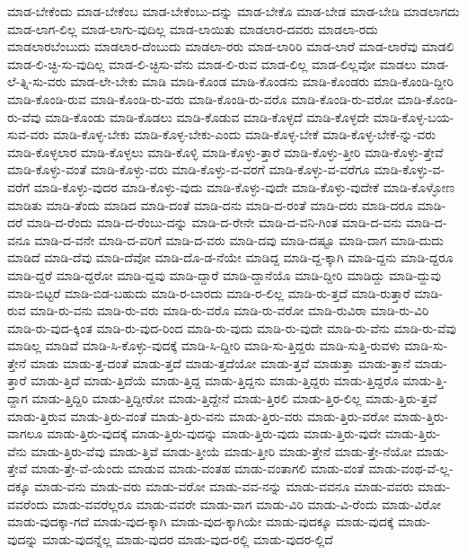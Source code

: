{ಮಾಡ-ಬೇಕೆಂದು
ಮಾಡ-ಬೇಕೆಂಬ
ಮಾಡ-ಬೇಕೆಂಬು-ದನ್ನು
ಮಾಡ-ಬೇಕೊ
ಮಾಡ-ಬೇಡ
ಮಾಡ-ಬೇಡಿ
ಮಾಡಲಾಗದು
ಮಾಡ-ಲಾಗ-ಲಿಲ್ಲ
ಮಾಡ-ಲಾಗು-ವುದಿಲ್ಲ
ಮಾಡ-ಲಾಯಿತು
ಮಾಡಲಾರ-ದವರು
ಮಾಡಲಾ-ರದು
ಮಾಡಲಾರಬೆಂಬುದು
ಮಾಡಲಾರ-ದೆಂಬುದು
ಮಾಡಲಾ-ರರು
ಮಾಡ-ಲಾರಿರಿ
ಮಾಡ-ಲಾರೆ
ಮಾಡ-ಲಾರೆವು
ಮಾಡಲಿ
ಮಾಡ-ಲಿ-ಚ್ಛಿ-ಸು-ವುದಿಲ್ಲ
ಮಾಡ-ಲಿ-ಚ್ಛಿಸು-ವೆನು
ಮಾಡ-ಲಿ-ರುವ
ಮಾಡ-ಲಿಲ್ಲ
ಮಾಡ-ಲಿಲ್ಲವೋ
ಮಾಡಲು
ಮಾಡ-ಲೆ-ತ್ನಿ-ಸು-ವರು
ಮಾಡ-ಲೇ-ಬೇಕು
ಮಾಡಿ
ಮಾಡಿ-ಕೊಂಡ
ಮಾಡಿ-ಕೊಂಡನು
ಮಾಡಿ-ಕೊಂಡರು
ಮಾಡಿ-ಕೊಂಡಿ-ದ್ದೀರಿ
ಮಾಡಿ-ಕೊಂಡಿ-ರುವ
ಮಾಡಿ-ಕೊಂಡಿ-ರು-ವರು
ಮಾಡಿ-ಕೊಂಡಿ-ರು-ವರೊ
ಮಾಡಿ-ಕೊಂಡಿ-ರು-ವರೋ
ಮಾಡಿ-ಕೊಂಡಿ-ರು-ವೆವು
ಮಾಡಿ-ಕೊಂಡು
ಮಾಡಿ-ಕೊಡಲು
ಮಾಡಿ-ಕೊಡುವ
ಮಾಡಿ-ಕೊಳ್ಳದೆ
ಮಾಡಿ-ಕೊಳ್ಳದೇ
ಮಾಡಿ-ಕೊಳ್ಳ-ಬಯ-ಸುವ-ವರು
ಮಾಡಿ-ಕೊಳ್ಳ-ಬೇಕು
ಮಾಡಿ-ಕೊಳ್ಳ-ಬೇಕು-ಎಂದು
ಮಾಡಿ-ಕೊಳ್ಳ-ಬೇಕೆ
ಮಾಡಿ-ಕೊಳ್ಳ-ಬೇಕೆ-ನ್ನು-ವರು
ಮಾಡಿ-ಕೊಳ್ಳಲಾರ
ಮಾಡಿ-ಕೊಳ್ಳಲು
ಮಾಡಿ-ಕೊಳ್ಳಿ
ಮಾಡಿ-ಕೊಳ್ಳು-ತ್ತಾರೆ
ಮಾಡಿ-ಕೊಳ್ಳು-ತ್ತೀರಿ
ಮಾಡಿ-ಕೊಳ್ಳು-ತ್ತೇವೆ
ಮಾಡಿ-ಕೊಳ್ಳು-ವಂತೆ
ಮಾಡಿ-ಕೊಳ್ಳು-ವರು
ಮಾಡಿ-ಕೊಳ್ಳು-ವ-ವರಗೆ
ಮಾಡಿ-ಕೊಳ್ಳು-ವ-ವರೆಗೂ
ಮಾಡಿ-ಕೊಳ್ಳು-ವ-ವರೆಗೆ
ಮಾಡಿ-ಕೊಳ್ಳು-ವುದರ
ಮಾಡಿ-ಕೊಳ್ಳು-ವುದು
ಮಾಡಿ-ಕೊಳ್ಳು-ವುದೇ
ಮಾಡಿ-ಕೊಳ್ಳು-ವುದೇಕೆ
ಮಾಡಿ-ಕೊಳ್ಳೋಣ
ಮಾಡಿತು
ಮಾಡಿ-ತೆಂದು
ಮಾಡಿದ
ಮಾಡಿ-ದಂತೆ
ಮಾಡಿ-ದನು
ಮಾಡಿ-ದ-ರಂತೆ
ಮಾಡಿ-ದರು
ಮಾಡಿ-ದರೂ
ಮಾಡಿ-ದರೆ
ಮಾಡಿ-ದ-ರೆಂದು
ಮಾಡಿ-ದ-ರೆಂಬು-ದನ್ನು
ಮಾಡಿ-ದ-ರೇನೇ
ಮಾಡಿ-ದ-ವನಿ-ಗಿಂತ
ಮಾಡಿ-ದ-ವನು
ಮಾಡಿ-ದ-ವನೂ
ಮಾಡಿ-ದ-ವನೇ
ಮಾಡಿ-ದ-ವರಿಗೆ
ಮಾಡಿ-ದ-ವರು
ಮಾಡಿ-ದವು
ಮಾಡಿ-ದಷ್ಟೂ
ಮಾಡಿ-ದಾಗ
ಮಾಡಿ-ದುದು
ಮಾಡಿದೆ
ಮಾಡಿ-ದೆವು
ಮಾಡಿ-ದೆವೋ
ಮಾಡಿ-ದೊ-ಡ-ನೆಯೇ
ಮಾಡಿದ್ದ
ಮಾಡಿ-ದ್ದ-ಕ್ಕಾಗಿ
ಮಾಡಿ-ದ್ದನು
ಮಾಡಿ-ದ್ದರೂ
ಮಾಡಿ-ದ್ದರೆ
ಮಾಡಿ-ದ್ದರೋ
ಮಾಡಿ-ದ್ದವು
ಮಾಡಿ-ದ್ದಾರೆ
ಮಾಡಿ-ದ್ದಾನೆಯೊ
ಮಾಡಿ-ದ್ದೀರಿ
ಮಾಡಿದ್ದು
ಮಾಡಿ-ದ್ದುವು
ಮಾಡಿ-ಬಿಟ್ಟರೆ
ಮಾಡಿ-ಬಿಡ-ಬಹುದು
ಮಾಡಿ-ರ-ಬಾರದು
ಮಾಡಿ-ರ-ಲಿಲ್ಲ
ಮಾಡಿ-ರು-ತ್ತದೆ
ಮಾಡಿ-ರುತ್ತಾರೆ
ಮಾಡಿ-ರುವ
ಮಾಡಿ-ರು-ವನು
ಮಾಡಿ-ರು-ವರು
ಮಾಡಿ-ರು-ವರೊ
ಮಾಡಿ-ರು-ವರೋ
ಮಾಡಿ-ರುವಿರಾ
ಮಾಡಿ-ರು-ವಿರಿ
ಮಾಡಿ-ರು-ವುದ-ಕ್ಕಿಂತ
ಮಾಡಿ-ರು-ವುದ-ರಿಂದ
ಮಾಡಿ-ರು-ವುದು
ಮಾಡಿ-ರು-ವುದೇ
ಮಾಡಿ-ರು-ವೆನು
ಮಾಡಿ-ರು-ವೆವು
ಮಾಡಿಲ್ಲ
ಮಾಡಿವೆ
ಮಾಡಿ-ಸಿ-ಕೊಳ್ಳು-ವುದಕ್ಕೆ
ಮಾಡಿ-ಸಿ-ದ್ದೀರಿ
ಮಾಡಿ-ಸು-ತ್ತಿದ್ದರು
ಮಾಡಿ-ಸುತ್ತಿ-ರುವಳು
ಮಾಡಿ-ಸು-ತ್ತೇನೆ
ಮಾಡು
ಮಾಡು-ತ್ತ-ದಂತೆ
ಮಾಡು-ತ್ತದೆ
ಮಾಡು-ತ್ತದೆಯೋ
ಮಾಡು-ತ್ತವೆ
ಮಾಡುತ್ತಾ
ಮಾಡು-ತ್ತಾನೆ
ಮಾಡು-ತ್ತಾರೆ
ಮಾಡು-ತ್ತಿದೆ
ಮಾಡು-ತ್ತಿದೆಯೆ
ಮಾಡು-ತ್ತಿದ್ದ
ಮಾಡು-ತ್ತಿದ್ದನು
ಮಾಡು-ತ್ತಿದ್ದರು
ಮಾಡು-ತ್ತಿದ್ದರೊ
ಮಾಡು-ತ್ತಿ-ದ್ದಾಗ
ಮಾಡು-ತ್ತಿದ್ದಿರಿ
ಮಾಡು-ತ್ತಿದ್ದೀರೋ
ಮಾಡು-ತ್ತಿದ್ದೇನೆ
ಮಾಡು-ತ್ತಿರಲಿ
ಮಾಡು-ತ್ತಿರ-ಲಿಲ್ಲ
ಮಾಡು-ತ್ತಿರು-ತ್ತವೆ
ಮಾಡು-ತ್ತಿರುವ
ಮಾಡು-ತ್ತಿರು-ವಂತೆ
ಮಾಡು-ತ್ತಿರು-ವನು
ಮಾಡು-ತ್ತಿರು-ವರು
ಮಾಡು-ತ್ತಿರು-ವರೋ
ಮಾಡು-ತ್ತಿರು-ವಾಗಲೂ
ಮಾಡು-ತ್ತಿರು-ವುದಕ್ಕೆ
ಮಾಡು-ತ್ತಿರು-ವುದನ್ನು
ಮಾಡು-ತ್ತಿರು-ವುದು
ಮಾಡು-ತ್ತಿರು-ವುದೇ
ಮಾಡು-ತ್ತಿರು-ವೆನು
ಮಾಡು-ತ್ತಿರು-ವೆವು
ಮಾಡು-ತ್ತಿವೆ
ಮಾಡು-ತ್ತೀಯೆ
ಮಾಡು-ತ್ತೀರಿ
ಮಾಡು-ತ್ತೇನೆ
ಮಾಡು-ತ್ತೇ-ನೆಯೋ
ಮಾಡು-ತ್ತೇವೆ
ಮಾಡು-ತ್ತೇ-ವೆ-ಯೆಂದು
ಮಾಡುವ
ಮಾಡು-ವಂತಹ
ಮಾಡು-ವಂತಾಗಲಿ
ಮಾಡು-ವಂತೆ
ಮಾಡು-ವಂಥ-ವೆ-ಲ್ಲ-ದಕ್ಕೂ
ಮಾಡು-ವನು
ಮಾಡು-ವರು
ಮಾಡು-ವರೋ
ಮಾಡು-ವವ-ನನ್ನು
ಮಾಡು-ವವನೂ
ಮಾಡು-ವವರು
ಮಾಡು-ವವರೆಂದು
ಮಾಡು-ವವರೆಲ್ಲರೂ
ಮಾಡು-ವವರೇ
ಮಾಡು-ವಾಗ
ಮಾಡು-ವಿರಿ
ಮಾಡು-ವಿ-ರೆಂದು
ಮಾಡು-ವಿರೋ
ಮಾಡು-ವುದಕ್ಕಾ-ಗದೆ
ಮಾಡು-ವುದ-ಕ್ಕಾಗಿ
ಮಾಡು-ವುದ-ಕ್ಕಾಗಿಯೇ
ಮಾಡು-ವುದಕ್ಕೂ
ಮಾಡು-ವುದಕ್ಕೆ
ಮಾಡು-ವುದನ್ನು
ಮಾಡು-ವುದನ್ನೆಲ್ಲ
ಮಾಡು-ವುದರ
ಮಾಡು-ವುದ-ರಲ್ಲಿ
ಮಾಡು-ವುದರ-ಲ್ಲಿದೆ
}
